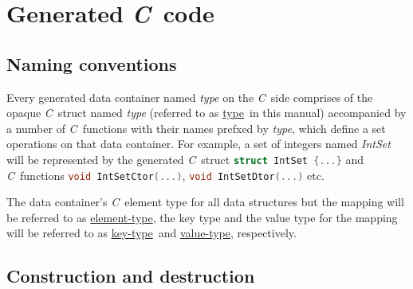 \documentclass[a4paper]{article}
\newcommand{\C}{\emph{C}}
\newcommand{\st}{\underline{type}}
\newcommand{\et}{\underline{element-type}}
\newcommand{\kt}{\underline{key-type}}
\newcommand{\vt}{\underline{value-type}}
\newcommand{\sv}{\emph{self}}
\newcommand{\meth}[1]{#1}
\begin{document}
\section{Generated \C\ code}


\newcommand{\commonmethods}{


\item \meth{void \st Dtor(\st*\ \sv)}


Destroys the container along with all contained elements.


\item \meth{\st* \st New(size\_t \emph{size})}


Returns a new heap-allocated container constructed with \meth{\st Ctor()}.


\item \meth{void \st Destroy(\st* \sv)}


Frees the heap-allocated container destroying all contained elements.


\item \meth{\st* \st Assign(\st* \sv)}


\emph{Should be used on heap-allocated containers only.}


\item \meth{size\_t \st Size(\st* \sv)}


Returns the number of elements in container.

	
}


\subsection{Naming conventions}


Every generated data container named \emph{type} on the \C\ side comprises of the opaque \C\ struct named \emph{type} (referred to as \st\ in this manual) accompanied by a number of \C\ functions with their names prefxed by \emph{type}, which define a set operations on that data container.
For example, a set of integers named \emph{IntSet} will be represented by the generated \C\ struct \lstinline[language=C]!struct IntSet {...}! and \C\ functions \lstinline[language=C]!void IntSetCtor(...)!, \lstinline[language=C]!void IntSetDtor(...)! etc.

The data container's \C\ element type for all data structures but the mapping will be referred to as \et, the key type and the value type for the mapping will be referred to as \kt\ and \vt, respectively.


\subsection{Construction and destruction}
\end{document}
